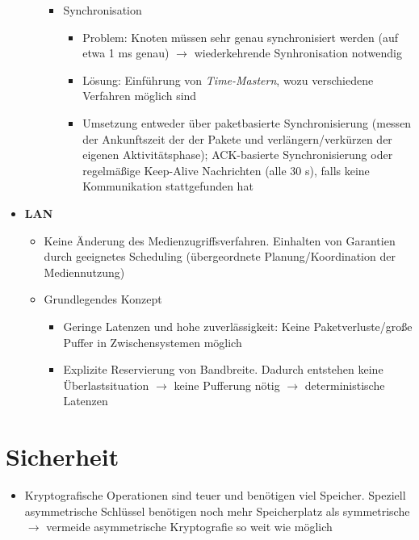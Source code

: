 \begin{itemize}
\begin{itemize}
\begin{itemize}
			\item Synchronisation
			\begin{itemize}
				\item Problem: Knoten müssen sehr genau synchronisiert werden (auf etwa 1 ms genau) \(\rightarrow\) wiederkehrende Synhronisation notwendig
				\item Lösung: Einführung von \textit{Time-Mastern}, wozu verschiedene Verfahren möglich sind
				\item Umsetzung entweder über paketbasierte Synchronisierung (messen der Ankunftszeit der der Pakete und verlängern/verkürzen der eigenen Aktivitätsphase); ACK-basierte Synchronisierung oder regelmäßige Keep-Alive Nachrichten (alle 30 s), falls keine Kommunikation stattgefunden hat
			\end{itemize}
		\end{itemize}
	\end{itemize}
	\item \textbf{LAN}
	\begin{itemize}
		\item Keine Änderung des Medienzugriffsverfahren. Einhalten von Garantien durch geeignetes Scheduling (übergeordnete Planung/Koordination der Mediennutzung)
		\item Grundlegendes Konzept
		\begin{itemize}
			\item Geringe Latenzen und hohe zuverlässigkeit: Keine Paketverluste/große Puffer in Zwischensystemen möglich
			\item Explizite Reservierung von Bandbreite. Dadurch entstehen keine Überlastsituation \(\rightarrow\) keine Pufferung nötig \(\rightarrow\) deterministische Latenzen
		\end{itemize}
	\end{itemize}
\end{itemize}


\section{Sicherheit}
\begin{itemize}
	\item Kryptografische Operationen sind teuer und benötigen viel Speicher. Speziell asymmetrische Schlüssel benötigen noch mehr Speicherplatz als symmetrische \(\rightarrow\) vermeide asymmetrische Kryptografie so weit wie möglich
\end{itemize}

